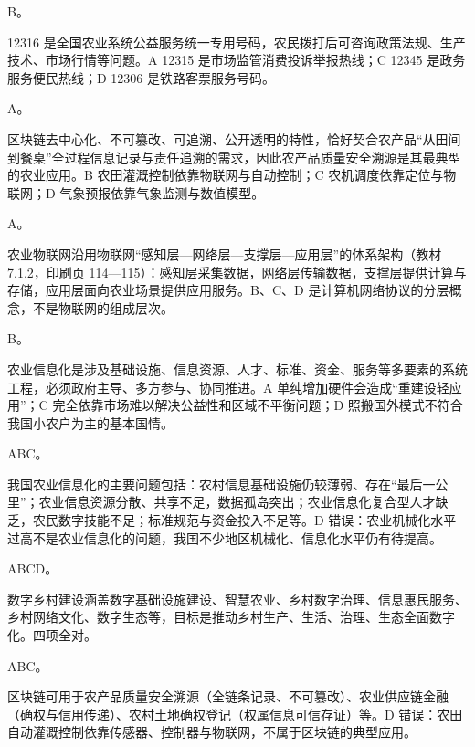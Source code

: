 \documentclass[a4paper,11pt]{article}
\begin{document}
\q B。\begin{analysis}12316 是全国农业系统公益服务统一专用号码，农民拨打后可咨询政策法规、生产技术、市场行情等问题。A 12315 是市场监管消费投诉举报热线；C 12345 是政务服务便民热线；D 12306 是铁路客票服务号码。\end{analysis}

\q A。\begin{analysis}区块链去中心化、不可篡改、可追溯、公开透明的特性，恰好契合农产品“从田间到餐桌”全过程信息记录与责任追溯的需求，因此农产品质量安全溯源是其最典型的农业应用。B 农田灌溉控制依靠物联网与自动控制；C 农机调度依靠定位与物联网；D 气象预报依靠气象监测与数值模型。\end{analysis}

\q A。\begin{analysis}农业物联网沿用物联网“感知层—网络层—支撑层—应用层”的体系架构（教材 7.1.2，印刷页 114—115）：感知层采集数据，网络层传输数据，支撑层提供计算与存储，应用层面向农业场景提供应用服务。B、C、D 是计算机网络协议的分层概念，不是物联网的组成层次。\end{analysis}

\q B。\begin{analysis}农业信息化是涉及基础设施、信息资源、人才、标准、资金、服务等多要素的系统工程，必须政府主导、多方参与、协同推进。A 单纯增加硬件会造成“重建设轻应用”；C 完全依靠市场难以解决公益性和区域不平衡问题；D 照搬国外模式不符合我国小农户为主的基本国情。\end{analysis}


\q ABC。\begin{analysis}我国农业信息化的主要问题包括：农村信息基础设施仍较薄弱、存在“最后一公里”；农业信息资源分散、共享不足，数据孤岛突出；农业信息化复合型人才缺乏，农民数字技能不足；标准规范与资金投入不足等。D 错误：农业机械化水平过高不是农业信息化的问题，我国不少地区机械化、信息化水平仍有待提高。\end{analysis}

\q ABCD。\begin{analysis}数字乡村建设涵盖数字基础设施建设、智慧农业、乡村数字治理、信息惠民服务、乡村网络文化、数字生态等，目标是推动乡村生产、生活、治理、生态全面数字化。四项全对。\end{analysis}

\q ABC。\begin{analysis}区块链可用于农产品质量安全溯源（全链条记录、不可篡改）、农业供应链金融（确权与信用传递）、农村土地确权登记（权属信息可信存证）等。D 错误：农田自动灌溉控制依靠传感器、控制器与物联网，不属于区块链的典型应用。\end{analysis}
\end{document}
